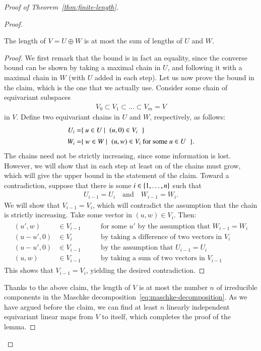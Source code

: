 \begin{proof}[Proof of Theorem~\ref{thm:finite-length}]
\begin{proof}
        \begin{claim}
            The length of $V= U \oplus W$ is at most the sum of lengths of $U$ and $W$.
        \end{claim}
        \begin{proof}
            We first remark that the bound is in fact an equality, since the converse bound can be shown by taking a maximal chain in $U$, and following it with a maximal chain in $W$ (with $U$ added in each step). Let us now prove the bound in the claim, which is the one that we actually use. Consider some chain  of equivariant subspaces
            \begin{align*}
            V_0 \subset V_1 \subset \ldots \subset V_m = V
            \end{align*}
            in $V$. Define two equivariant chains in  $U$ and $W$, respectively,  as follows: 
            \begin{align*}
            U_i = & \setbuild{ u \in U}{$(u,0) \in V_i$}\\
            W_i = &  \setbuild{ w \in W}{$(u,w) \in V_i$ for some $u \in U$}.
            \end{align*}
 The chains need not be strictly increasing, since some information is lost. However, we will show that in each step at least on of the chains must grow, which will give the upper bound in the statement of the claim. Toward a contradiction, suppose that there is some $i \in \{1,\ldots,n\}$ such that 
            \begin{align*}
            U_{i-1} = U_i \quad \text{and} \quad W_{i-1} = W_i.
            \end{align*}
            We will show that $V_{i-1} = V_i$, which will contradict the assumption that the chain is strictly increasing. Take some vector in $(u,w) \in V_i$. Then:
            \begin{eqnarray*}
                \begin{array}{lll}
                                (u',w) &\in V_{i-1} &\qquad  \text{for some $u'$ by the assumption that $W_{i-1} = W_i$}\\
            (u-u',0) &\in V_{i} &\qquad  \text{by taking a difference of two vectors in $V_i$}\\
            (u-u',0) &\in V_{i-1} &\qquad  \text{by the assumption that $U_{i-1} = U_i$}\\
            (u,w) & \in V_{i-1} &\qquad  \text{by taking a sum of two vectors in $V_{i-1}$}
                \end{array}
            \end{eqnarray*}
            This shows that $V_{i-1} = V_i$, yielding the desired contradiction.
        \end{proof}
        Thanks to the above claim, the length of $V$ is at most the number $n$ of irreducible components in the Maschke decomposition~\eqref{eq:maschke-decomposition}. As we have argued before the claim, we can find at least $n$ linearly independent equivariant linear maps from $V$ to itself, which completes the proof of the lemma.
    \end{proof}


\end{proof}
